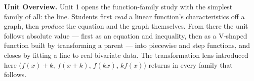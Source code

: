 \documentclass[10pt]{article}
\begin{document}

\vspace*{1.38in}

\begin{tcolorbox}[colback=forestbg,colframe=forest,boxrule=0.9pt,arc=2mm,
    left=4mm,right=4mm,top=3mm,bottom=3mm]
  \textbf{Unit Overview.}\quad
  Unit 1 opens the function-family study with the simplest family of all: the line.
  Students first \emph{read} a linear function's characteristics off a graph, then
  \emph{produce} the equation and the graph themselves. From there the unit follows
  absolute value --- first as an equation and inequality, then as a V-shaped function
  built by transforming a parent --- into piecewise and step functions, and closes by
  fitting a line to real bivariate data. The transformation lens introduced here
  ($f(x)+k$, $f(x+k)$, $f(kx)$, $kf(x)$) returns in every family that follows.
\end{tcolorbox}

\vspace{0.18in}
\end{document}
